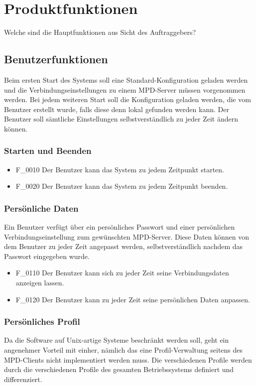 \chapter{Produktfunktionen}
Welche sind die Hauptfunktionen aus Sicht des Auftraggebers?
\section{Benutzerfunktionen}
Beim ersten Start des Systems soll eine Standard-Konfiguration geladen werden und die Verbindungseinstellungen
zu einem MPD-Server müssen vorgenommen werden. Bei jedem weiteren Start soll die Konfiguration geladen werden,
die vom Benutzer erstellt wurde, falls diese denn lokal gefunden werden kann. Der Benutzer soll sämtliche
Einstellungen selbstverständlich zu jeder Zeit ändern können.
\subsection{Starten und Beenden}
\renewcommand{\labelitemi}{•}
\begin{itemize}
	\item F\_0010 Der Benutzer kann das System zu jedem Zeitpunkt starten.
	\item F\_0020 Der Benutzer kann das System zu jedem Zeitpunkt beenden.
\end{itemize}
\subsection{Persönliche Daten}
Ein Benutzer verfügt über ein persönliches Passwort und einer persönlichen Verbindungseinstellung zum gewünschten
MPD-Server. Diese Daten können von dem Benutzer zu jeder Zeit angepasst werden, selbstverständlich nachdem das
Passwort eingegeben wurde.
\begin{itemize}
	\item F\_0110 Der Benutzer kann sich zu jeder Zeit seine Verbindungsdaten anzeigen lassen.
	\item F\_0120 Der Benutzer kann zu jeder Zeit seine persönlichen Daten anpassen.
\end{itemize}
\subsection{Persönliches Profil}
Da die Software auf Unix-artige Systeme beschränkt werden soll, geht ein angenehmer Vorteil mit einher, nämlich das
eine Profil-Verwaltung seitens des MPD-Clients nicht implementiert werden muss. Die verschiedenen Profile werden
durch die verschiedenen Profile des gesamten Betriebssystems definiert und differenziert.
